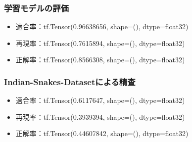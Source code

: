 \documentclass[a4paper, 11pt, titlepage]{jsarticle}
\begin{document}
\subsubsection{学習モデルの評価}
\begin{itemize}
\item 適合率：tf.Tensor(0.96638656, shape=(), dtype=float32)
\item 再現率：tf.Tensor(0.7615894, shape=(), dtype=float32) 
\item 正解率：tf.Tensor(0.8566308, shape=(), dtype=float32)
\end{itemize}
\subsubsection{Indian-Snakes-Datasetによる精査}
\begin{itemize}
\item 適合率：tf.Tensor(0.6117647, shape=(), dtype=float32)
\item 再現率：tf.Tensor(0.3939394, shape=(), dtype=float32) 
\item 正解率：tf.Tensor(0.44607842, shape=(), dtype=float32)
\end{itemize}
\end{document}
